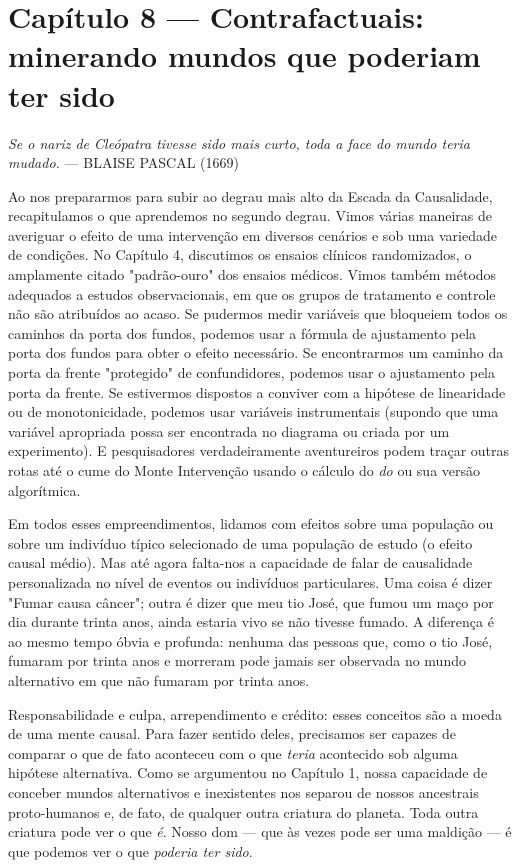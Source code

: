 \documentclass[11pt,a5paper,twoside]{book}
\begin{document}
\chapter{Capítulo 8 — Contrafactuais: minerando mundos que poderiam ter sido}
\textit{Se o nariz de Cleópatra tivesse sido mais curto, toda a face do mundo teria mudado.} — BLAISE PASCAL (1669)

Ao nos prepararmos para subir ao degrau mais alto da Escada da Causalidade, recapitulamos o que aprendemos no segundo degrau. Vimos várias maneiras de averiguar o efeito de uma intervenção em diversos cenários e sob uma variedade de condições. No Capítulo 4, discutimos os ensaios clínicos randomizados, o amplamente citado "padrão-ouro" dos ensaios médicos. Vimos também métodos adequados a estudos observacionais, em que os grupos de tratamento e controle não são atribuídos ao acaso. Se pudermos medir variáveis que bloqueiem todos os caminhos da porta dos fundos, podemos usar a fórmula de ajustamento pela porta dos fundos para obter o efeito necessário. Se encontrarmos um caminho da porta da frente "protegido" de confundidores, podemos usar o ajustamento pela porta da frente. Se estivermos dispostos a conviver com a hipótese de linearidade ou de monotonicidade, podemos usar variáveis instrumentais (supondo que uma variável apropriada possa ser encontrada no diagrama ou criada por um experimento). E pesquisadores verdadeiramente aventureiros podem traçar outras rotas até o cume do Monte Intervenção usando o cálculo do \textit{do} ou sua versão algorítmica.

Em todos esses empreendimentos, lidamos com efeitos sobre uma população ou sobre um indivíduo típico selecionado de uma população de estudo (o efeito causal médio). Mas até agora falta-nos a capacidade de falar de causalidade personalizada no nível de eventos ou indivíduos particulares. Uma coisa é dizer "Fumar causa câncer"; outra é dizer que meu tio José, que fumou um maço por dia durante trinta anos, ainda estaria vivo se não tivesse fumado. A diferença é ao mesmo tempo óbvia e profunda: nenhuma das pessoas que, como o tio José, fumaram por trinta anos e morreram pode jamais ser observada no mundo alternativo em que não fumaram por trinta anos.

Responsabilidade e culpa, arrependimento e crédito: esses conceitos são a moeda de uma mente causal. Para fazer sentido deles, precisamos ser capazes de comparar o que de fato aconteceu com o que \textit{teria} acontecido sob alguma hipótese alternativa. Como se argumentou no Capítulo 1, nossa capacidade de conceber mundos alternativos e inexistentes nos separou de nossos ancestrais proto-humanos e, de fato, de qualquer outra criatura do planeta. Toda outra criatura pode ver o que \textit{é}. Nosso dom — que às vezes pode ser uma maldição — é que podemos ver o que \textit{poderia ter sido}.
\end{document}
